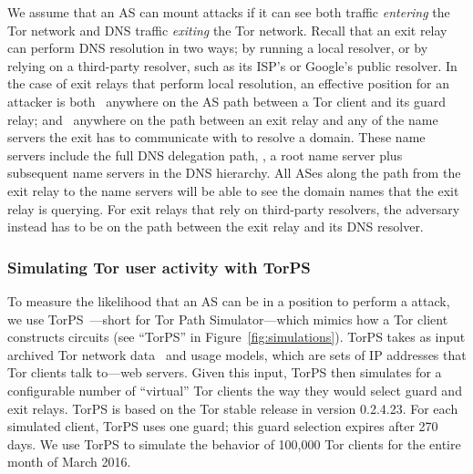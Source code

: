 We assume that an AS can mount \name attacks if it can see both traffic
\emph{entering} the Tor network and DNS traffic \emph{exiting} the Tor network.
Recall that an exit relay can perform DNS resolution in two ways; by running a
local resolver, or by relying on a third-party resolver, such as its ISP's or
Google's public resolver.  In the case of exit relays that perform local
resolution, an effective position for an attacker is both \first~anywhere on the
AS path between a Tor client and its guard relay; and \second~anywhere on the
path between an exit relay and any of the name servers the exit has to
communicate with to resolve a domain.  These name servers include the full DNS
delegation path, \ie, a root name server plus subsequent name servers in the DNS
hierarchy.  All ASes along the path from the exit relay to the name servers will
be able to see the domain names that the exit relay is querying.  For exit
relays that rely on third-party resolvers, the adversary instead has to be on
the path between the exit relay and its DNS resolver.

\subsubsection{Simulating Tor user activity with TorPS}

To measure the likelihood that an AS can be in a position to perform a \name
attack, we use TorPS~\cite{TorPS}---short for Tor Path Simulator---which mimics
how a Tor client constructs circuits (see ``TorPS'' in
Figure~\ref{fig:simulations}).  TorPS takes as input archived Tor network
data~\cite{collector} and usage models, which are sets of IP addresses that Tor
clients talk to---\eg web servers.  Given this input, TorPS then simulates for a
configurable number of ``virtual'' Tor clients the way they would select guard
and exit relays.  TorPS is based on the Tor stable release in version 0.2.4.23.
For each simulated client, TorPS uses one guard; this guard selection expires
after 270 days.  We use TorPS to simulate the behavior of 100,000 Tor clients
for the entire month of March 2016.


